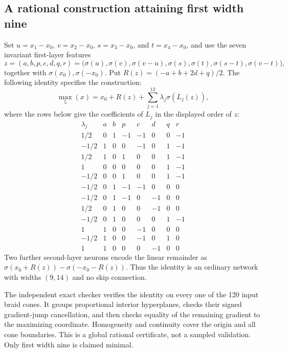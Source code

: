 \subsection{A rational construction attaining first width nine}
\label{app:first-five-upper}

Set $u=x_1-x_0$, $v=x_2-x_0$, $s=x_3-x_0$, and $t=x_4-x_0$, and use the
seven invariant first-layer features
\[
 z=(a,b,p,c,d,q,r)
  =\bigl(\sigma(u),\sigma(v),\sigma(v-u),\sigma(s),\sigma(t),
               \sigma(s-t),\sigma(v-t)\bigr),
\]
together with $\sigma(x_0),\sigma(-x_0)$. Put
$R(z)=(-a+b+2d+q)/2$. The following identity specifies the construction:
\[
 \max_5(x)=x_0+R(z)+\sum_{j=1}^{12}\lambda_j\sigma(L_j(z)),
\]
where the rows below give the coefficients of $L_j$ in the displayed
order of $z$:
\[
\begin{array}{c|rrrrrrr}
\lambda_j&a&b&p&c&d&q&r\\ \hline
 1/2&0&1&-1&-1&0&0&-1\\
 -1/2&1&0&0&-1&0&1&-1\\
 1/2&1&0&1&0&0&1&-1\\
 1&0&0&0&0&0&1&-1\\
 -1/2&0&0&1&0&0&1&-1\\
 -1/2&0&1&-1&-1&0&0&0\\
 -1/2&0&1&-1&0&-1&0&0\\
 1/2&0&1&0&0&-1&0&0\\
 -1/2&0&1&0&0&0&1&-1\\
 1&1&0&0&-1&0&0&0\\
 -1/2&1&0&0&-1&0&1&0\\
 1&1&0&0&0&-1&0&0
\end{array}
\]
Two further second-layer neurons encode the linear remainder as
$\sigma(x_0+R(z))-\sigma(-x_0-R(z))$. Thus the identity is an ordinary
network with widths $(9,14)$ and no skip connection.

The independent exact checker verifies the identity on every one of the
120 input braid cones. It groups proportional interior hyperplanes,
checks their signed gradient-jump cancellation, and then checks equality
of the remaining gradient to the maximizing coordinate. Homogeneity and
continuity cover the origin and all cone boundaries. This is a global
rational certificate, not a sampled validation. Only first width nine is
claimed minimal.
